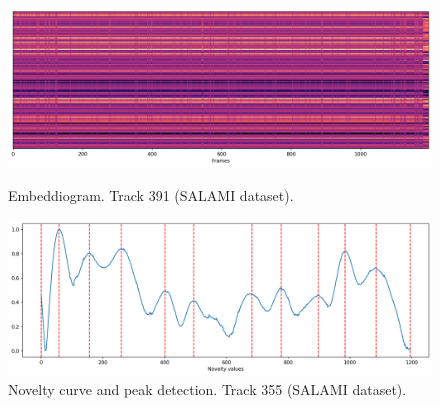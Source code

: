 \begin{figure}[ht]
  \centering
  \begin{minipage}[b]{1.0\linewidth}
    \centering
    \includegraphics[width=\linewidth]{figures/images/355embeddiogramnormalized.png}
    \caption[Embeddiogram. Track 355 (SALAMI dataset).]{Embeddiogram. Track 391 (SALAMI dataset).}
    \label{fig:embeddiogram}
  \end{minipage}

  \begin{minipage}[b]{1.0\linewidth}
    \centering
    \includegraphics[width=\linewidth]{figures/images/355novelty.png}
    \caption[Novelty curve + peaks. Track 391 (SALAMI dataset).]{Novelty curve and peak detection. Track 355 (SALAMI dataset).}
    \label{fig:novelty}
  \end{minipage}
\end{figure}

